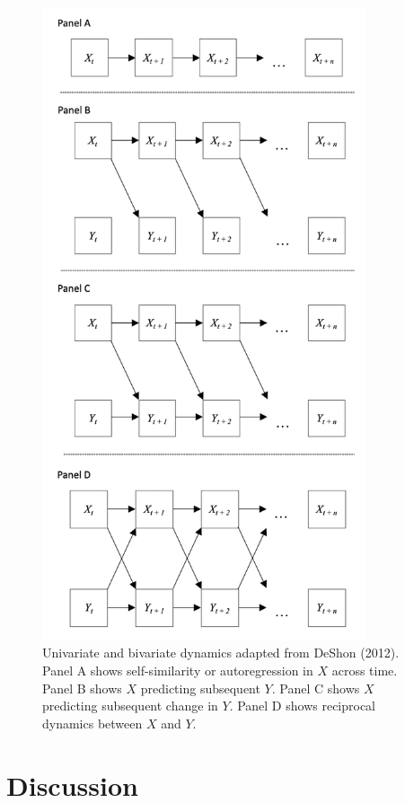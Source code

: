 \documentclass[english,,man]{apa6}
\theoremstyle{definition}
\theoremstyle{definition}
\theoremstyle{definition}
\theoremstyle{remark}
\begin{document}
\begin{figure}

{\centering \includegraphics[width=3.75in]{figures/dynamics/dall} 

}

\caption{Univariate and bivariate dynamics adapted from DeShon (2012). Panel A shows self-similarity or autoregression in $X$ across time. Panel B shows $X$ predicting subsequent $Y$. Panel C shows $X$ predicting subsequent change in $Y$. Panel D shows reciprocal dynamics between $X$ and $Y$.\label{dynamics_figure}}\label{fig:unnamed-chunk-17}
\end{figure}

\hypertarget{discussion}{%
\section{Discussion}\label{discussion}}
\end{document}
